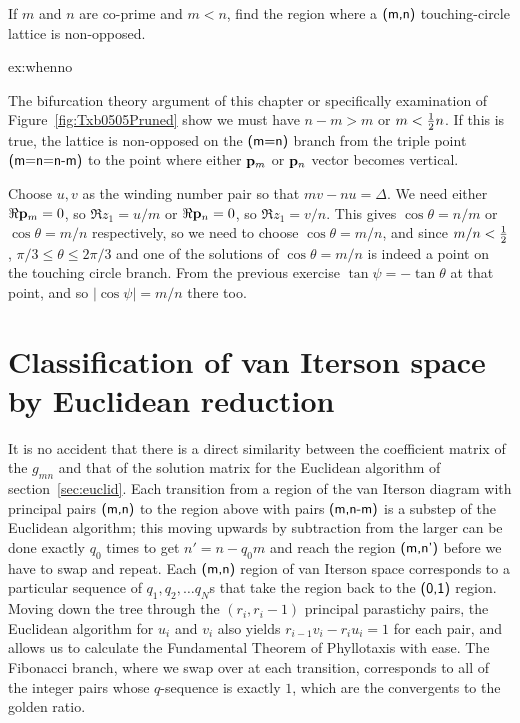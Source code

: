 	\begin{jExercise}\label{ex:whenno}
		If $m$ and $n$ are co-prime and $m<n$, find the region where a $\textsf{(m,n)}$ touching-circle lattice is non-opposed.
		
	\end{jExercise}
	\begin{jAnswer}{ex:whenno}{
		The bifurcation theory argument of this chapter or specifically examination of Figure~\ref{fig:Txb0505Pruned} show we must have $n-m>m$ or $ m < \textstyle{\frac{1}{2}} n$. If this is true, 
		the lattice is non-opposed  on the $\textsf{(m=n)}$ branch from the triple point $\textsf{(m=n=n-m)}$ to the point where either ${\mathbf p}_{m}$ or ${\mathbf p}_{n}$ vector becomes vertical.

			Choose $u,v$ as the winding number pair so that $m v - n u=\Delta$. We need either $\Re {\mathbf p}_{m}=0$, so $\Re z_1=u/m$ or $\Re {\mathbf p}_{n}=0$, so $\Re z_1=v/n$. This gives $\cos\theta=n/m$ or $\cos\theta=m/n$ respectively, so we need to choose $\cos\theta=m/n$,
			and since $m/n<\textstyle{\frac{1}{2}}$, $\pi/3\leq\theta\leq 2\pi/3$ and one of the solutions of  $\cos\theta=m/n$ is indeed a point on the touching circle
			 branch. From the previous exercise $\tan\psi=-\tan\theta$ at that point, 
			 and so $|\cos\psi|=m/n$ there too. 
}	\end{jAnswer}
	


\section{Classification of van Iterson space by Euclidean reduction}
It is no accident that there is a direct similarity between the coefficient matrix of the $g_{mn}$ and that of the solution matrix for the Euclidean algorithm of section~\ref{sec:euclid}.
Each transition from a region of the van Iterson diagram with principal pairs $\textsf{(m,n)}$ to the region above with pairs $\textsf{(m,n-m)}$ is a substep of the Euclidean algorithm; this moving upwards by subtraction from the larger can be done exactly $q_0$ times to get $n'=n-q_0 m$ and reach the region $\textsf{(m,n')}$ before we have to swap and repeat. 
Each $\textsf{(m,n)}$ region of van Iterson space corresponds to a particular sequence of  $q_1, q_2, \ldots q_N$s that take the region back to the $\textsf{(0,1)}$ region.     Moving down the tree through the $(r_i,r_i-1)$ principal parastichy pairs, the Euclidean algorithm for $u_i$ and $v_i$ also yields  $r_{i-1} v_i- r_i u_i=1$ for each pair, and allows us to calculate the Fundamental Theorem of Phyllotaxis with ease. The Fibonacci branch, where we swap over at each transition, corresponds to all of the integer pairs whose $q$-sequence is exactly $1$, which are the convergents to the golden ratio. 

